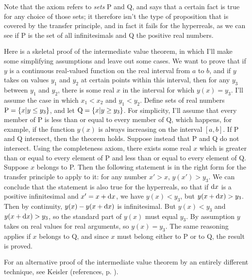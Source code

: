 Note that the axiom
refers to \emph{sets} P and Q, and says that a certain fact is true for any choice of those sets;
it therefore isn't the type of proposition that is covered by the transfer principle, and in fact
it fails for the hyperreals, as we can see if P is the set of all infinitesimals and Q the
positive real numbers.

Here is a skeletal proof of the intermediate value theorem, in which I'll make some simplifying
assumptions and leave out some cases. We want to prove that if $y$ is a continuous real-valued function on the real interval from $a$ to $b$,
and if $y$ takes on values $y_1$ and $y_2$ at certain points within this interval, then for any $y_3$ between $y_1$ and
$y_2$, there is some real $x$ in the interval for which $y(x)=y_3$.
I'll assume the case in which $x_1<x_2$ and $y_1<y_2$.
Define sets of real numbers $\textup{P}=\{x|y \le y_3\}$, and let $\textup{Q}=\{x|y \ge y_3\}$.
For simplicity, I'll assume that every member of P is less than or equal to
every member of Q, which happens, for example, if the function $y(x)$ is always increasing
on the interval $[a,b]$. If P and Q intersect, then the theorem holds.
Suppose instead that P and Q do not intersect.
Using the completeness axiom, there exists some real $x$ which is greater than or equal
to every element of P and less than or equal to every element of Q.
Suppose $x$ belongs to P.
Then the following
statement is in the right form for the transfer principle to apply to it: for any number
$x'>x$, $y(x')>y_3$. We can conclude that the statement is also true for the hyperreals,
so that if $\textup{d} x$ is a positive infinitesimal and $x'=x+\textup{d} x$, we have $y(x)<y_3$, but $y(x+\textup{d} x)>y_3$.
Then by continuity, $y(x)-y(x+\textup{d} x)$ is infinitesimal. But $y(x)<y_3$ and
$y(x+\textup{d} x)>y_3$, so the standard part of $y(x)$ must equal $y_3$. By assumption $y$ takes on real values
for real arguments, so $y(x)=y_3$. The same reasoning applies if $x$ belongs to Q, and since
$x$ must belong either to P or to Q, the result is proved.

For an alternative proof of the
intermediate value theorem by an entirely different technique, see Keisler (references, p. \pageref{references}).

